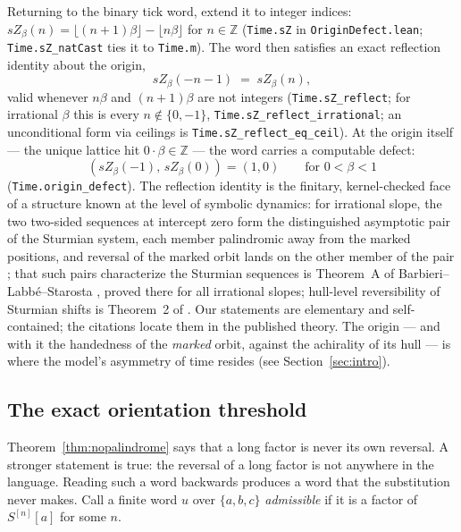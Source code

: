 \documentclass[11pt]{amsart}
\theoremstyle{plain}
\theoremstyle{definition}
\theoremstyle{remark}
\begin{document}
Returning to the binary tick word, extend it to integer indices:
$sZ_\beta(n) = \lfloor (n+1)\beta \rfloor - \lfloor n\beta \rfloor$ for $n \in \mathbb{Z}$
(\texttt{Time.sZ} in \texttt{OriginDefect.lean}; \texttt{Time.sZ\_natCast} ties it to
\texttt{Time.m}). The word then satisfies an exact reflection identity about the origin,
\[
  sZ_\beta(-n-1) \;=\; sZ_\beta(n),
\]
valid whenever $n\beta$ and $(n+1)\beta$ are not integers
(\texttt{Time.sZ\_reflect}; for irrational $\beta$ this is every $n \notin \{0,-1\}$,
\texttt{Time.sZ\_reflect\_irrational}; an unconditional form via ceilings is
\texttt{Time.sZ\_reflect\_eq\_ceil}). At the origin itself --- the unique lattice hit
$0 \cdot \beta \in \mathbb{Z}$ --- the word carries a computable defect:
\[
  (sZ_\beta(-1),\, sZ_\beta(0)) = (1, 0) \qquad \text{for } 0 < \beta < 1
\]
(\texttt{Time.origin\_defect}). The reflection identity is the finitary, kernel-checked
face of a structure known at the level of symbolic dynamics: for irrational slope, the two
two-sided sequences at intercept zero form the distinguished asymptotic pair of the Sturmian
system, each member palindromic away from the marked positions, and reversal of the marked
orbit lands on the other member of the pair \cite[Lemma~4.1]{barbieri2021}; that such pairs
characterize the Sturmian sequences is Theorem~A of
Barbieri--Labb\'e--Starosta \cite{barbieri2021}, proved there for all irrational slopes;
hull-level reversibility of Sturmian shifts is Theorem~2 of \cite{baakeroberts2018}. Our
statements are elementary and self-contained; the citations locate them in the published
theory. The origin --- and with it the handedness of the \emph{marked} orbit, against the
achirality of its hull --- is where the model's asymmetry of time resides (see
 Section~\ref{sec:intro}).

\subsection{The exact orientation threshold}
\label{sec:threshold}

Theorem~\ref{thm:nopalindrome} says that a long factor is never its own reversal. A
stronger statement is true: the reversal of a long factor is not anywhere in the language.
Reading such a word backwards produces a word that the substitution never makes. Call a
finite word $u$ over $\{a, b, c\}$ \emph{admissible} if it is a factor of $S^{[n]}[a]$ for
some $n$.
\end{document}
